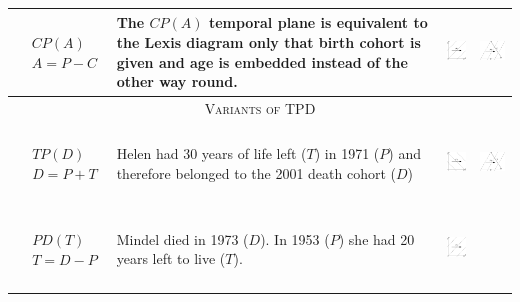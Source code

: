 \documentclass[
  12pt
]{scrartcl}
\begin{document}
\begin{center}
\begin{longtable}{m{}m{}m{}m{}}
  $$\begin{aligned}
    &CP(A) \\
    &A = P - C
  \end{aligned}$$ &
  The $CP(A)$ temporal plane is equivalent to the Lexis diagram only that birth cohort is given and age is embedded instead of the other way round. &
  \includegraphics[height = 2cm]{../fig/CPa.pdf} &
  \includegraphics[height = 2cm]{../fig/CPa_iso.pdf}  \\
  \midrule
  \multicolumn{4}{c}{\textsc{Variants of TPD}} \\
  \midrule
  $$\begin{aligned}
    &TP(D) \\
    &D = P + T
  \end{aligned}$$ &
  Helen had 30 years of life left ($T$) in 1971 ($P$) and therefore belonged to the 2001 death cohort ($D$) &
  \includegraphics[height = 2cm]{../fig/TPd.pdf} &
  \includegraphics[height = 2cm]{../fig/TPd_iso.pdf}  \\
  $$\begin{aligned}
    &PD(T) \\
    &T = D - P
  \end{aligned}$$ &
  Mindel died in 1973 ($D$). In 1953 ($P$) she had 20 years left to live ($T$). &
  \includegraphics[height = 2cm]{../fig/PDt.pdf} &

\end{longtable}
\end{center}
\end{document}
